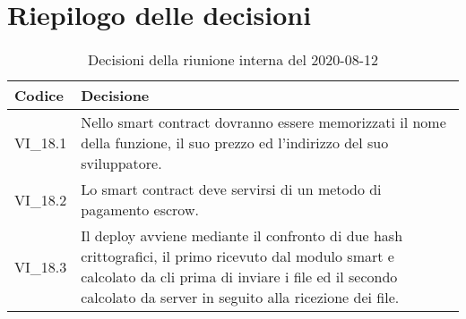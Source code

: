 \section{Riepilogo delle decisioni}
\begin{longtable}{ 
	 >{\centering}p{} >{}p{} }
	
	\caption{Decisioni della riunione interna del 2020-08-12}\\	
	
	\textbf{\color{white}Codice} & 
	\textbf{\color{white}Decisione} 
	\tabularnewline  
	\endhead
	
	VI\_18.1 & Nello smart contract dovranno essere memorizzati il nome della funzione, il suo prezzo ed l'indirizzo del suo sviluppatore. \\
	VI\_18.2 & Lo smart contract deve servirsi di un metodo di pagamento escrow. \\
	VI\_18.3 & Il deploy avviene mediante il confronto di due hash crittografici, il primo ricevuto dal modulo smart e calcolato da cli prima di inviare i file ed il secondo calcolato da server in seguito alla ricezione dei file. \\
	

\end{longtable}